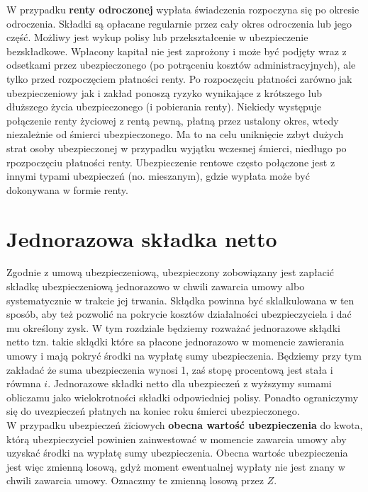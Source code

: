 \documentclass{article}
\begin{document}
W przypadku \textbf{renty odroczonej} wypłata świadczenia rozpoczyna się po okresie odroczenia. Składki są opłacane regularnie przez cały okres odroczenia lub jego część. Możliwy jest wykup polisy lub przekształcenie w ubezpieczenie bezskładkowe. Wpłacony kapitał nie jest zaprożony i może być podjęty wraz z odsetkami przez ubezpieczonego (po potrąceniu kosztów administracyjnych), ale tylko przed rozpoczęciem płatności renty. Po rozpoczęciu płatności zarówno jak ubezpieczeniowy jak i zakład ponoszą ryzyko wynikające z krótszego lub dłuższego życia ubezpieczonego (i pobierania renty). Niekiedy występuje połączenie renty życiowej z rentą pewną, płatną przez ustalony okres, wtedy niezależnie od śmierci ubezpieczonego. Ma to na celu uniknięcie zzbyt dużych strat osoby ubezpieczonej w przypadku wyjątku wczesnej śmierci, niedługo po rpozpoczęciu płatności renty. Ubezpieczenie rentowe często połączone jest z innymi typami ubezpieczeń (no. mieszanym), gdzie wypłata może być dokonywana w formie renty.

\section{Jednorazowa składka netto}

Zgodnie z umową ubezpieczeniową, ubezpieczony zobowiązany jest zapłacić składkę ubezpieczeniową jednorazowo w chwili zawarcia umowy albo systematycznie w trakcie jej trwania. Skłądka powinna być sklalkulowana w ten sposób, aby też pozwolić na pokrycie kosztów działalności ubezpieczyciela i dać mu określony zysk. W tym rozdziale będziemy rozważać jednorazowe skłądki netto tzn. takie skłądki które sa płacone jednorazowo w momencie zawierania umowy i mają pokryć środki na wypłatę sumy ubezpieczenia. Będziemy przy tym zakładać że suma ubezpieczenia wynosi 1, zaś stopę procentową jest stała i rówmna $ i $. Jednorazowe składki netto dla ubezpieczeń z wyższymy sumami obliczamu jako wielokrotności składki odpowiedniej polisy. Ponadto ograniczymy się do uvezpieczeń płatnych na koniec roku śmierci ubezpieczonego.\\

W przypadku ubezpieczeń żīciowych \textbf{obecna wartość ubezpieczenia} do kwota, którą ubezpieczyciel powinien zainwestować w momencie zawarcia umowy aby uzyskać środki na wypłatę sumy ubezpieczenia. Obecna wartośc ubezpieczenia jest więc zmienną losową, gdyż moment ewentualnej wypłaty nie jest znany w chwili zawarcia umowy. Oznaczmy te zmienną losową przez $ Z $. \\
\end{document}
